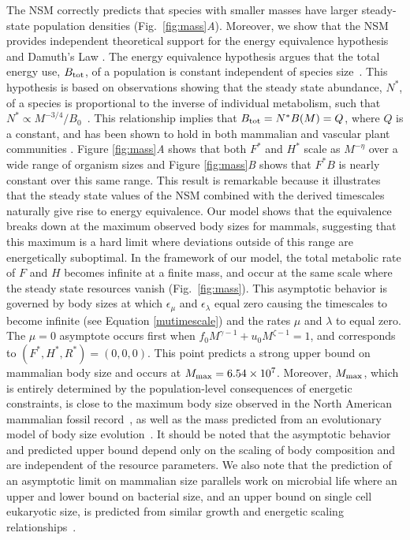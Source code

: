 \documentclass[twocolumn,preprintnumbers,amsmath,amssymb,superscriptaddress]{revtex4}
\begin{document}
\begin{bibunit}[unsrt]
The NSM correctly predicts that species with smaller masses have larger steady-state population densities (Fig.~\ref{fig:mass}\emph{A}).
Moreover, we show that the NSM provides independent theoretical support for the energy equivalence hypothesis and Damuth's Law \cite{Damuth:1987kr,allen2002,enquist1998}.
The energy equivalence hypothesis argues that the total energy use, $B_{\rm tot}$, of a population is constant independent of species size~\cite{Damuth:1987kr,allen2002,enquist1998}.
This hypothesis is based on observations showing that the steady state abundance, $N^*$, of a species is proportional to the inverse of individual metabolism, such that $N^*\propto M^{-3/4}/B_{0}$~\cite{allen2002,enquist1998}.
This relationship implies that $B_{\rm tot}=N^*B(M)=Q$, where $Q$ is a constant, and has been shown to hold in both mammalian and vascular plant communities \cite{Damuth:1987kr,allen2002,enquist1998}.
Figure \ref{fig:mass}\emph{A} shows that both $F^{*}$ and $H^{*}$ scale as $M^{-\eta}$ over a wide range of organism sizes and Figure \ref{fig:mass}\emph{B} shows that $F^{*}B$ is nearly constant over this same range.
This result is remarkable because it illustrates that the steady state values of the NSM combined with the derived timescales naturally give rise to energy equivalence.
Our model shows that the equivalence breaks down at the maximum observed body sizes for mammals, suggesting that this maximum is a hard limit where deviations outside of this range are energetically suboptimal.
In the framework of our model, the total metabolic rate of $F$ and $H$ becomes infinite at a finite mass, and occur at the same scale where the steady state resources vanish (Fig.~\ref{fig:mass}). This asymptotic behavior is governed by body sizes at which $\epsilon_{\mu}$ and $\epsilon_{\lambda}$ equal zero causing the timescales to become infinite (see Equation \ref{mutimescale}) and the rates $\mu$ and $\lambda$ to equal zero.
The $\mu=0$ asymptote occurs first when $f_{0}M^{\gamma-1}+u_{0}M^{\zeta-1}=1$, and corresponds to $(F^*,H^*,R^*)=(0,0,0)$. This point predicts a strong upper bound on mammalian body size and occurs at $M_{\rm max}=6.54\times10^7$.
Moreover, $M_{\rm max}$, which is entirely determined by the population-level consequences of energetic constraints, is close to the maximum body size observed in the North American mammalian fossil record~\cite{Alroy:1998p1594}, as well as the mass predicted from an evolutionary model of body size evolution~\cite{Clauset:2009fh}.
It should be noted that the asymptotic behavior and predicted upper bound depend only on the scaling of body composition and are independent of the resource parameters.
We also note that the prediction of an asymptotic limit on mammalian size parallels work on microbial life where an upper and lower bound on bacterial size, and an upper bound on single cell eukaryotic size, is predicted from similar growth and energetic scaling relationships~\cite{Kempes:2012hy,Kempes:2016}. %





\end{bibunit}
\end{document}
